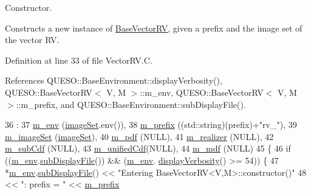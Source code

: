 Constructor. 

Constructs a new instance of \hyperlink{class_q_u_e_s_o_1_1_base_vector_r_v}{Base\-Vector\-R\-V}, given a prefix and the image set of the vector R\-V. 

Definition at line 33 of file Vector\-R\-V.\-C.



References Q\-U\-E\-S\-O\-::\-Base\-Environment\-::display\-Verbosity(), Q\-U\-E\-S\-O\-::\-Base\-Vector\-R\-V$<$ V, M $>$\-::m\-\_\-env, Q\-U\-E\-S\-O\-::\-Base\-Vector\-R\-V$<$ V, M $>$\-::m\-\_\-prefix, and Q\-U\-E\-S\-O\-::\-Base\-Environment\-::sub\-Display\-File().


\begin{DoxyCode}
36   :
37   \hyperlink{class_q_u_e_s_o_1_1_base_vector_r_v_a556761c50e2d171977ef5f19a63c8c73}{m\_env}       (\hyperlink{class_q_u_e_s_o_1_1_base_vector_r_v_aa4dd2f036228eac1f945bacc7147a922}{imageSet}.env()),
38   \hyperlink{class_q_u_e_s_o_1_1_base_vector_r_v_a030ce3bc9873a9eaf6d8bf452c096ab3}{m\_prefix}    ((std::string)(prefix)+\textcolor{stringliteral}{"rv\_"}),
39   \hyperlink{class_q_u_e_s_o_1_1_base_vector_r_v_ad31872bb4da22d47528cb9d691b3b7ff}{m\_imageSet}  (\hyperlink{class_q_u_e_s_o_1_1_base_vector_r_v_aa4dd2f036228eac1f945bacc7147a922}{imageSet}),
40   \hyperlink{class_q_u_e_s_o_1_1_base_vector_r_v_a0ca926bca6fbcc688be6fc7496449e8e}{m\_pdf}       (NULL),
41   \hyperlink{class_q_u_e_s_o_1_1_base_vector_r_v_ad99bc05293c0fd0a0accb3191fb7119e}{m\_realizer}  (NULL),
42   \hyperlink{class_q_u_e_s_o_1_1_base_vector_r_v_a1a1117671c7fa2e572a9484463bee3a5}{m\_subCdf}    (NULL),
43   \hyperlink{class_q_u_e_s_o_1_1_base_vector_r_v_a31a1d44bbb6a7c030ca31a9577904252}{m\_unifiedCdf}(NULL),
44   \hyperlink{class_q_u_e_s_o_1_1_base_vector_r_v_a5a95d0107f66cf9b0ed3ad18a3d738df}{m\_mdf}       (NULL)
45 \{
46   \textcolor{keywordflow}{if} ((\hyperlink{class_q_u_e_s_o_1_1_base_vector_r_v_a556761c50e2d171977ef5f19a63c8c73}{m\_env}.\hyperlink{class_q_u_e_s_o_1_1_base_environment_a8a0064746ae8dddfece4229b9ad374d6}{subDisplayFile}()) && (\hyperlink{class_q_u_e_s_o_1_1_base_vector_r_v_a556761c50e2d171977ef5f19a63c8c73}{m\_env}.
      \hyperlink{class_q_u_e_s_o_1_1_base_environment_a1fe5f244fc0316a0ab3e37463f108b96}{displayVerbosity}() >= 54)) \{
47     *\hyperlink{class_q_u_e_s_o_1_1_base_vector_r_v_a556761c50e2d171977ef5f19a63c8c73}{m\_env}.\hyperlink{class_q_u_e_s_o_1_1_base_environment_a8a0064746ae8dddfece4229b9ad374d6}{subDisplayFile}() << \textcolor{stringliteral}{"Entering BaseVectorRV<V,M>::constructor()"}
48                             << \textcolor{stringliteral}{": prefix = "} << \hyperlink{class_q_u_e_s_o_1_1_base_vector_r_v_a030ce3bc9873a9eaf6d8bf452c096ab3}{m\_prefix}

\end{DoxyCode}
